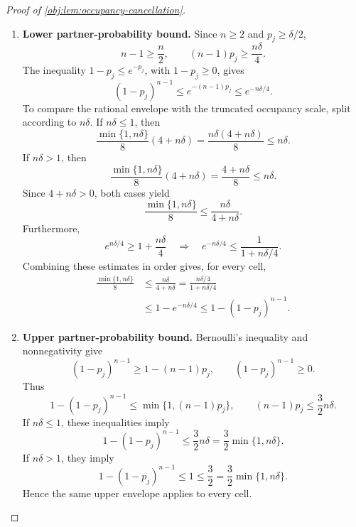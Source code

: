 \documentclass[11pt]{article}
\begin{document}
\begin{proof}[Proof of \cref{obj:lem:occupancy-cancellation}]
\begin{enumerate}
The probability law \(\mathsf G_j\otimes\mathsf G_j\) is supported on
\(C_j\times C_j\). Therefore,
\[
\begin{aligned}
|\nu_j-\theta(P)d_j|
&=
\left|\int
 \bigl(\mathcal K_{N,P}-\theta(P)\mathcal K_{D,P}\bigr)
 \,d(\mathsf G_j\otimes\mathsf G_j)\right|\\
&\le
\int
 \left|\mathcal K_{N,P}-\theta(P)\mathcal K_{D,P}\right|
 \,d(\mathsf G_j\otimes\mathsf G_j)\\
&\le
b\int\mathcal K_{D,P}\,d(\mathsf G_j\otimes\mathsf G_j)
=bd_j.
\end{aligned}
\]

\item \textbf{Lower partner-probability bound.}
Since \(n\ge2\) and \(p_j\ge\delta/2\),
\[
n-1\ge\frac n2,
\qquad
(n-1)p_j\ge\frac{n\delta}{4}.
\]
The inequality \(1-p_j\le e^{-p_j}\), with \(1-p_j\ge0\), gives
\[
(1-p_j)^{n-1}
\le e^{-(n-1)p_j}
\le e^{-n\delta/4}.
\]
To compare the rational envelope with the truncated occupancy scale, split according to \(n\delta\). If \(n\delta\le1\), then
\[
\frac{\min\{1,n\delta\}}8(4+n\delta)
=\frac{n\delta(4+n\delta)}8
\le n\delta.
\]
If \(n\delta>1\), then
\[
\frac{\min\{1,n\delta\}}8(4+n\delta)
=\frac{4+n\delta}{8}
\le n\delta.
\]
Since \(4+n\delta>0\), both cases yield
\[
\frac{\min\{1,n\delta\}}8
\le\frac{n\delta}{4+n\delta}.
\]
Furthermore,
\[
e^{n\delta/4}\ge1+\frac{n\delta}{4}
\quad\Longrightarrow\quad
e^{-n\delta/4}\le
\frac{1}{1+n\delta/4}.
\]
Combining these estimates in order gives, for every cell,
\[
\begin{aligned}
\frac{\min\{1,n\delta\}}8
&\le\frac{n\delta}{4+n\delta}
=\frac{n\delta/4}{1+n\delta/4}\\
&\le1-e^{-n\delta/4}
\le1-(1-p_j)^{n-1}.
\end{aligned}
\]

\item \textbf{Upper partner-probability bound.}
Bernoulli's inequality and nonnegativity give
\[
(1-p_j)^{n-1}\ge1-(n-1)p_j,
\qquad
(1-p_j)^{n-1}\ge0.
\]
Thus
\[
1-(1-p_j)^{n-1}
\le\min\{1,(n-1)p_j\},
\qquad
(n-1)p_j\le\frac32n\delta.
\]
If \(n\delta\le1\), these inequalities imply
\[
1-(1-p_j)^{n-1}
\le\frac32n\delta
=\frac32\min\{1,n\delta\}.
\]
If \(n\delta>1\), they imply
\[
1-(1-p_j)^{n-1}
\le1\le\frac32
=\frac32\min\{1,n\delta\}.
\]
Hence the same upper envelope applies to every cell.


\end{enumerate}
\end{proof}
\end{document}

